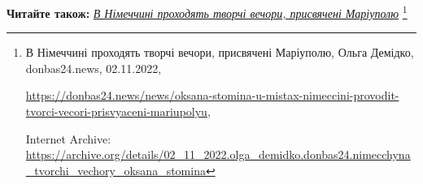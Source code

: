  
 
 
 
 

\textbf{Читайте також:} \href{https://archive.org/details/02_11_2022.olga_demidko.donbas24.nimecchyna_tvorchi_vechory_oksana_stomina}{\emph{В Німеччині проходять творчі вечори, присвячені Маріуполю}}%
\footnote{В Німеччині проходять творчі вечори, присвячені Маріуполю, Ольга Демідко, donbas24.news, 02.11.2022, \par%
\url{https://donbas24.news/news/oksana-stomina-u-mistax-nimeccini-provodit-tvorci-vecori-prisvyaceni-mariupolyu}, \par%
Internet Archive: \url{https://archive.org/details/02_11_2022.olga_demidko.donbas24.nimecchyna_tvorchi_vechory_oksana_stomina}%
}
